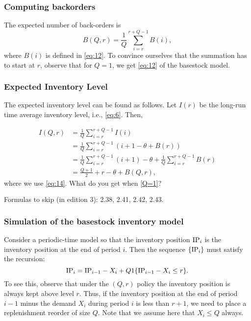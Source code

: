\subsubsection{Computing  backorders}

The expected number of back-orders is 
\begin{equation}
  \label{eq:14}
   B(Q,r) = \frac1Q \sum_{i=r}^{r+Q-1} B(i),
\end{equation}
where $B(i)$ is defined in \ref{eq:12}. To convince ourselves
that the summation has to start at $r$, observe that for
$Q=1$, we get \ref{eq:12} of the basestock model.


\subsubsection{Expected Inventory Level}

The expected inventory level can be found as follows. Let $I(r)$
be the long-run time average inventory level, i.e., \ref{eq:6}. Then,

\begin{equation*}
  \begin{split}
   I(Q,r)
   &= \frac1Q\sum_{i=r}^{r+Q-1} I(i) \\
   &= \frac1Q\sum_{i=r}^{r+Q-1} (i+1 - \theta + B(r)) \\
   &= \frac1Q\sum_{i=r}^{r+Q-1} (i + 1)  - \theta + \frac1Q\sum_{i=r}^{r+Q-1} B(r) \\
   &= \frac{Q+1}2 + r - \theta + B(Q,r), 
  \end{split}
\end{equation*}
where we use \ref{eq:14}. What do you get when \ref{Q=1}?

Formulas to skip (in edition 3): 2.38, 2.41, 2.42, 2.43.


\subsubsection{Simulation of the basestock inventory model}

Consider a periodic-time model so that the inventory position $\textrm{IP}_i$
is the inventory position at the end of period $i$. Then the sequence
$\{\textrm{IP}_i\}$ must satisfy the recursion:
\begin{equation}
  \textrm{IP}_i = \textrm{IP}_{i-1} - X_i + Q 1\{\textrm{IP}_{i-1} - X_i\leq r\}.
\end{equation}
To see this, observe that under the $(Q,r)$ policy the inventory
position is always kept above level $r$. Thus, if the inventory
position at the end of period $i-1$ minus the demand $X_i$ during
period $i$ is less than $r+1$, we need to place a replenishment
reorder of size $Q$.  Note that we assume here that $X_i\leq Q$ always.

